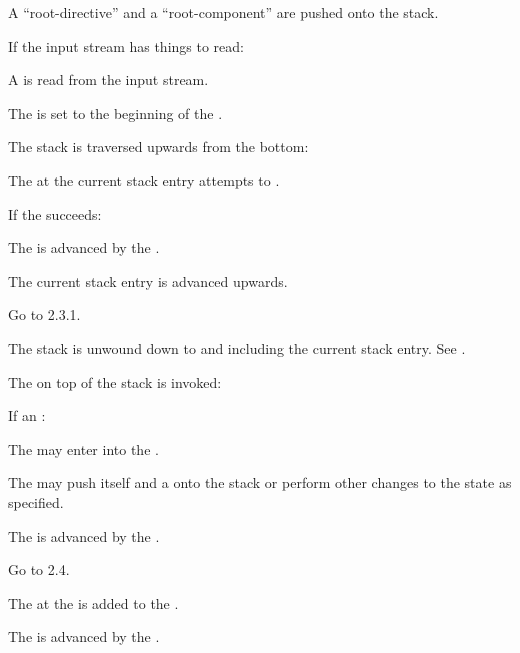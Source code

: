 \begin{step}
\item A ``root-directive'' and a ``root-component'' are pushed onto the stack.
\item If the input stream has things to read:
  \begin{step}
  \item A  is read from the input stream.
  \item The  is set to the beginning of the .
  \item The stack is traversed upwards from the bottom:
    \begin{step}
    \item The  at the current stack entry attempts to .
    \item If the  succeeds:
      \begin{step}
      \item The  is advanced by the  .
      \item The current stack entry is advanced upwards.
      \item Go to 2.3.1.
      \end{step}
    \item The stack is unwound down to and including the current stack entry. See .
    \end{step}
  \item The  on top of the stack is invoked:
    \begin{step}
    \item If an  :
      \begin{step}
      \item The   may enter  into the .
      \item The   may push itself and a  onto the stack or perform other changes to the state as specified.
      \item The  is advanced by the  .
      \item Go to 2.4.
      \end{step}
    \item The  at the  is added to the .
    \item The  is advanced by the .

\end{step}
\end{step}
\end{step}
